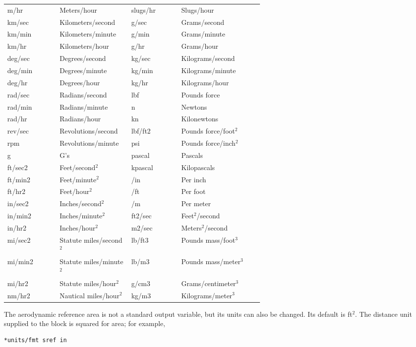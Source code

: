 \begin{longtable}{@{}>{\ttfamily}lp{0.29\linewidth}>{\ttfamily}lp{0.32\linewidth}@{}}
  m/hr & Meters/hour & slugs/hr & Slugs/hour \\
  km/sec & Kilometers/second & g/sec & Grams/second \\
  km/min & Kilometers/minute & g/min & Grams/minute \\
  km/hr & Kilometers/hour & g/hr & Grams/hour \\
  deg/sec & Degrees/second & kg/sec & Kilograms/second \\
  deg/min & Degrees/minute & kg/min & Kilograms/minute \\
  deg/hr & Degrees/hour & kg/hr & Kilograms/hour \\
  rad/sec & Radians/second & lbf & Pounds force \\
  rad/min & Radians/minute & n & Newtons \\
  rad/hr & Radians/hour & kn & Kilonewtons \\
  rev/sec & Revolutions/second & lbf/ft2 & Pounds force/foot$^2$ \\
  rpm & Revolutions/minute & psi & Pounds force/inch$^2$ \\
  g & G's & pascal & Pascals \\
  ft/sec2 & Feet/second$^2$ & kpascal & Kilopascals \\
  ft/min2 & Feet/minute$^2$ & 1/in & Per inch \\
  ft/hr2 & Feet/hour$^2$ & 1/ft & Per foot \\
  in/sec2 & Inches/second$^2$ & 1/m & Per meter \\
  in/min2 & Inches/minute$^2$ & ft2/sec & Feet$^2$/second \\
  in/hr2 & Inches/hour$^2$ & m2/sec & Meters$^2$/second \\
  mi/sec2 & Statute miles/second$^2$ & lb/ft3 & Pounds mass/foot$^3$ \\
  mi/min2 & Statute miles/minute$^2$ & lb/m3 & Pounds mass/meter$^3$ \\
  mi/hr2 & Statute miles/hour$^2$ & g/cm3 & Grams/centimeter$^3$ \\
  nm/hr2 & Nautical miles/hour$^2$ & kg/m3 & Kilograms/meter$^3$ \\
  \bottomrule
\end{longtable}

The aerodynamic reference area  is not a standard output variable,
but its units can also be changed. Its default is ft$^2$. The distance unit supplied to
the block is squared for area; for example,

\begin{lstlisting}[style=taosmanual]
*units/fmt sref in
\end{lstlisting}

